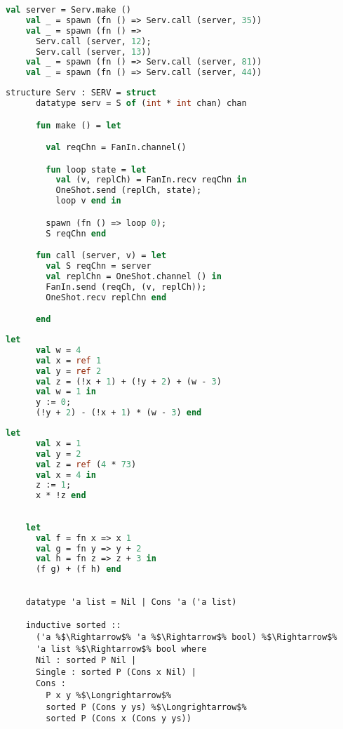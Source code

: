 \documentclass{article}
\begin{document}
  \begin{lstlisting}[language=ML, style=codestyle1]
    val server = Serv.make ()
    val _ = spawn (fn () => Serv.call (server, 35))
    val _ = spawn (fn () => 
      Serv.call (server, 12); 
      Serv.call (server, 13))
    val _ = spawn (fn () => Serv.call (server, 81))
    val _ = spawn (fn () => Serv.call (server, 44))
    \end{lstlisting}

  \begin{lstlisting}[language=ML, style=codestyle1]
    structure Serv : SERV = struct 
      datatype serv = S of (int * int chan) chan 

      fun make () = let 

        val reqChn = FanIn.channel()

        fun loop state = let
          val (v, replCh) = FanIn.recv reqChn in 
          OneShot.send (replCh, state);
          loop v end in

        spawn (fn () => loop 0);
        S reqChn end 

      fun call (server, v) = let 
        val S reqChn = server
        val replChn = OneShot.channel () in 
        FanIn.send (reqCh, (v, replCh));
        OneShot.recv replChn end

      end
    \end{lstlisting}

  \begin{lstlisting}[language=ML, style=codestyle1]
    let
      val w = 4
      val x = ref 1
      val y = ref 2
      val z = (!x + 1) + (!y + 2) + (w - 3)
      val w = 1 in
      y := 0;
      (!y + 2) - (!x + 1) * (w - 3) end
    \end{lstlisting}

  \begin{lstlisting}[language=ML, style=codestyle1]
    let 
      val x = 1  
      val y = 2
      val z = ref (4 * 73)
      val x = 4 in 
      z := 1; 
      x * !z end
    \end{lstlisting}

  \begin{lstlisting}[language=ML, style=codestyle1]

    let 
      val f = fn x => x 1
      val g = fn y => y + 2
      val h = fn z => z + 3 in 
      (f g) + (f h) end

  \end{lstlisting}


  \begin{lstlisting}[style=codestyle1, escapechar=\%]

    datatype 'a list = Nil | Cons 'a ('a list)

    inductive sorted ::
      ('a %$\Rightarrow$% 'a %$\Rightarrow$% bool) %$\Rightarrow$%
      'a list %$\Rightarrow$% bool where
      Nil : sorted P Nil |
      Single : sorted P (Cons x Nil) |
      Cons :
        P x y %$\Longrightarrow$%
        sorted P (Cons y ys) %$\Longrightarrow$%
        sorted P (Cons x (Cons y ys))
    \end{lstlisting}
\end{document}
